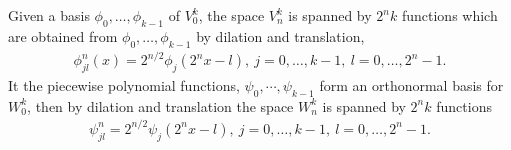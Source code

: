 \documentclass[final,leqno]{siamltex704}
\newcommand{\bv}{{\bf v}}
\def\bv{{\bf v}}
\def\bw{{\bf w}}
\begin{document}
Given a basis $\phi_0,\dots,\phi_{k-1}$ of $V_0^k$, the space $V_n^k$ is spanned by $2^nk$ functions which are obtained from $\phi_0,\dots,\phi_{k-1}$ by dilation and translation,
\begin{eqnarray}
\phi_{jl}^n(x)=2^{n/2}\phi_j(2^nx-l),\ j=0,\dots,k-1,\ l=0,\dots,2^n-1.
\end{eqnarray}
It the piecewise polynomial functions, $\psi_0,\cdots,\psi_{k-1}$ form an orthonormal basis for $W_0^k$, then by dilation and translation the space $W_n^k$ is spanned by $2^nk$ functions
\begin{eqnarray}
\psi_{jl}^n=2^{n/2}\psi_j(2^nx-l),\ j=0,\dots,k-1,\ l=0,\dots,2^n-1.
\end{eqnarray}

%
%
%
%
%
%
\end{document}
